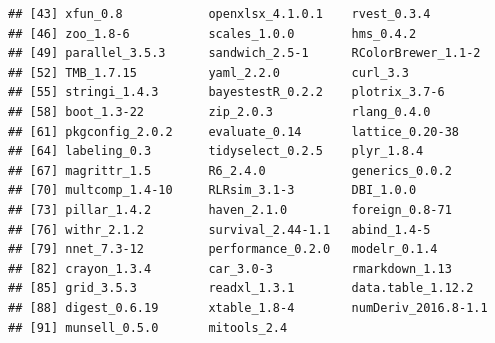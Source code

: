\documentclass[]{article}
\begin{document}
\begin{verbatim}
## [43] xfun_0.8            openxlsx_4.1.0.1    rvest_0.3.4        
## [46] zoo_1.8-6           scales_1.0.0        hms_0.4.2          
## [49] parallel_3.5.3      sandwich_2.5-1      RColorBrewer_1.1-2 
## [52] TMB_1.7.15          yaml_2.2.0          curl_3.3           
## [55] stringi_1.4.3       bayestestR_0.2.2    plotrix_3.7-6      
## [58] boot_1.3-22         zip_2.0.3           rlang_0.4.0        
## [61] pkgconfig_2.0.2     evaluate_0.14       lattice_0.20-38    
## [64] labeling_0.3        tidyselect_0.2.5    plyr_1.8.4         
## [67] magrittr_1.5        R6_2.4.0            generics_0.0.2     
## [70] multcomp_1.4-10     RLRsim_3.1-3        DBI_1.0.0          
## [73] pillar_1.4.2        haven_2.1.0         foreign_0.8-71     
## [76] withr_2.1.2         survival_2.44-1.1   abind_1.4-5        
## [79] nnet_7.3-12         performance_0.2.0   modelr_0.1.4       
## [82] crayon_1.3.4        car_3.0-3           rmarkdown_1.13     
## [85] grid_3.5.3          readxl_1.3.1        data.table_1.12.2  
## [88] digest_0.6.19       xtable_1.8-4        numDeriv_2016.8-1.1
## [91] munsell_0.5.0       mitools_2.4
\end{verbatim}
\end{document}
